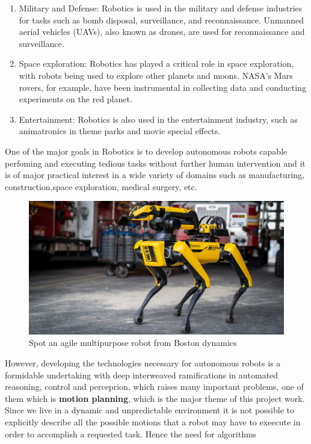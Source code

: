 \begin{enumerate}
    \item Military and Defense: Robotics is used in the military and defense industries for tasks such as bomb disposal, surveillance, and reconnaissance. Unmanned aerial vehicles (UAVs), also known as drones, are used for reconnaissance and surveillance.

    \item Space exploration: Robotics has played a critical role in space exploration, with robots being used to explore other planets and moons. NASA's Mars rovers, for example, have been instrumental in collecting data and conducting experiments on the red planet.
    
    

    \item Entertainment: Robotics is also used in the entertainment industry, such as animatronics in theme parks and movie special effects.
\end{enumerate}

One of the major goals in Robotics is to develop autonomous robots capable perfoming and executing tedious tasks without further human intervention and it is of major practical interest in a wide variety of domains such as manufacturing, construction,space exploration, medical surgery, etc.
\begin{figure}[H]
    \centering
    \includegraphics[scale=.5]{images/boston-dynamics-spot}
    \caption[Boston dynamics robot (spot)]{Spot an agile multipurpose robot from Boston dynamics \protect\footnotemark} 
\end{figure}
However, developing the technologies necessary for autonomous robots is a formidable undertaking with deep interweaved ramifications in automated reasoning, control and perceprion, which raises many important problems, one of them which is \textbf{motion planning}, which is the major theme of this project work. Since we live in a dynamic and unpredictable environment it is not possible to explicitly describe all the possible motions that a robot may have to exeecute in order to accomplish a requested task. Hence the need for algorithms 

